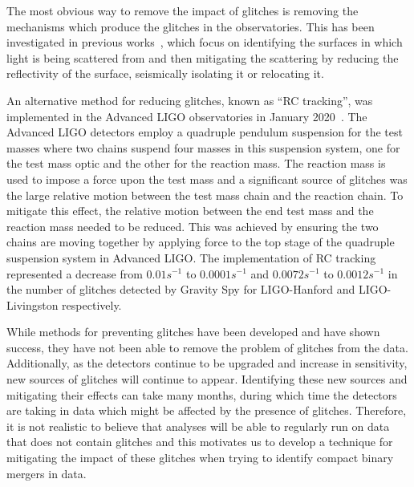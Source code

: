 The most obvious way to remove the impact of glitches is removing the mechanisms which produce the glitches in the observatories. This has been investigated in previous works~\cite{reducing_scattering:2020, TAccadia:2010, Nuttall:2018, gwadaptive:2022, HilbertHuang:2017, tvf-EMD:2020, Scattering_Monitoring:2022, Was_Subtract:2021}, which focus on identifying the surfaces in which light is being scattered from and then mitigating the scattering by reducing the reflectivity of the surface, seismically isolating it or relocating it. 

An alternative method for reducing \scl{} glitches, known as ``RC tracking'', was implemented in the Advanced LIGO observatories in January 2020~\cite{reducing_scattering:2020}. The Advanced LIGO detectors employ a quadruple pendulum suspension for the test masses where two chains suspend four masses in this suspension system, one for the test mass optic and the other for the reaction mass. The reaction mass is used to impose a force upon the test mass and a significant source of \scl{} glitches was the large relative motion between the test mass chain and the reaction chain. To mitigate this effect, the relative motion between the end test mass and the reaction mass needed to be reduced. This was achieved by ensuring the two chains are moving together by applying force to the top stage of the quadruple suspension system in Advanced LIGO. The implementation of RC tracking represented a decrease from $0.01 s^{-1}$ to $0.0001 s^{-1}$ and $0.0072 s^{-1}$ to $0.0012 s^{-1}$ in the number of \scl{} glitches detected by Gravity Spy for LIGO-Hanford and LIGO-Livingston respectively.

While methods for preventing \scl{} glitches have been developed and have shown success, they have not been able to remove the problem of \scl{} glitches from the data. Additionally, as the detectors continue to be upgraded and increase in sensitivity, new sources of \scl{} glitches will continue to appear. Identifying these new sources and mitigating their effects can take many months, during which time the detectors are taking in data which might be affected by the presence of \scl{} glitches. Therefore, it is not realistic to believe that analyses will be able to regularly run on data that does not contain \scl{} glitches and this motivates us to develop a technique for mitigating the impact of these glitches when trying to identify compact binary mergers in \gw{} data.

